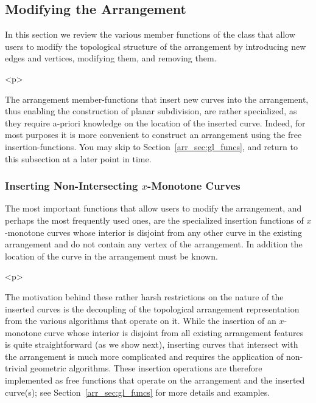\subsection{Modifying the Arrangement}
\label{arr_ssec:modify}
%
In this section we review the various member functions of the
 class that allow users to modify the
topological structure of the arrangement by introducing new edges
and vertices, modifying them, and removing them.

\begin{ccHtmlOnly}<p>\end{ccHtmlOnly}
The arrangement member-functions that insert new curves into the
arrangement, thus enabling the construction of planar subdivision, are
rather specialized, as they require a-priori knowledge on the location of
the inserted curve. Indeed, for most purposes it is more convenient to
construct an arrangement using the free insertion-functions. You may
skip to Section~\ref{arr_sec:gl_funcs}, and return to this subsection at
a later point in time.

\subsubsection{Inserting Non-Intersecting $x$-Monotone Curves}
\label{arr_sssec:mf_insert_cv}
%
The most important functions that allow users to modify the
arrangement, and perhaps the most frequently used ones, are the
specialized insertion functions of $x$-monotone curves whose
interior is disjoint from any other curve in the existing
arrangement and do not contain any vertex of the arrangement. In
addition the location of the curve in the arrangement must be known.

\begin{ccHtmlOnly}<p>\end{ccHtmlOnly}
The motivation behind these rather harsh restrictions on the nature of
the inserted curves is the decoupling of the topological arrangement
representation from the various algorithms that operate on it. While
the insertion of an $x$-monotone curve whose interior is disjoint from
all existing arrangement features is quite straightforward (as we show
next), inserting curves that intersect with the arrangement is much
more complicated and requires the application of non-trivial
geometric algorithms. These insertion operations are therefore
implemented as free functions that operate on the arrangement and
the inserted curve(s); see Section~\ref{arr_sec:gl_funcs} for more
details and examples.

